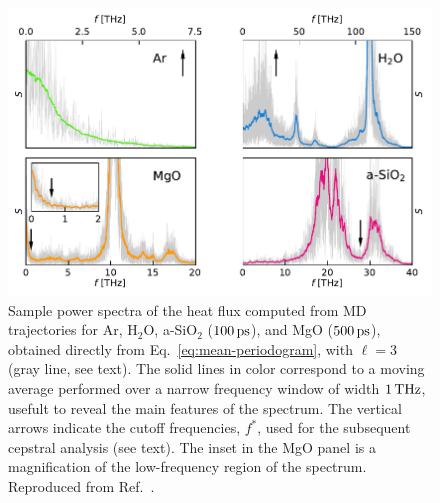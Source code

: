 \begin{figure}[!htb]
    \centering
    \includegraphics[width=\textwidth]{chapters/chapter5/figures/periodograms.pdf}
    \caption{Sample power spectra of the heat flux computed from MD trajectories for Ar, H$_2$O, a-SiO$_2$ ($100\,\mathrm{ps}$), and MgO ($500\,\mathrm{ps}$), obtained directly from Eq.~\eqref{eq:mean-periodogram}, with $\ell=3$ (gray line, see text). The solid lines in color correspond to a moving average performed over a narrow frequency window of width $1\,\mathrm{THz}$, usefult to reveal the main features of the spectrum. The vertical arrows indicate the cutoff frequencies, $f^*$, used for the subsequent cepstral analysis (see text). The inset in the MgO panel is a magnification of the low-frequency region of the spectrum. Reproduced from Ref.~\cite{Ercole2017}.
    }
    \label{fig:periodograms}
\end{figure}

